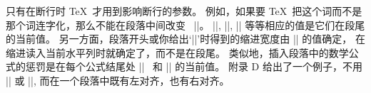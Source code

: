 \danger 只有在断行时 \TeX\ 才用到影响断行的参数。%
例如，如果要 \TeX\ 把这个词而不是那个词连字化，那么不能在段落中间改变%
~|\hyphenpenalty|。%
|\hyphenpenalty|, |\rightskip|, |\hsize| 等等相应的值是它们在段尾的当前值。%
另一方面，段落开头或你给出`|\indent|'时得到的缩进宽度由 |\parindent| 的值确定，
在缩进读入当前水平列时就确定了，而不是在段尾。%
类似地，插入段落中的数学公式的惩罚是在每个公式结尾处 |\binoppenalty|~%
和 |\relpenalty| 的当前值。%
附录 D 给出了一个例子，不用 |\leftskip| 或 |\rightskip|,
而在一个段落中既有左对齐，也有右对齐。

